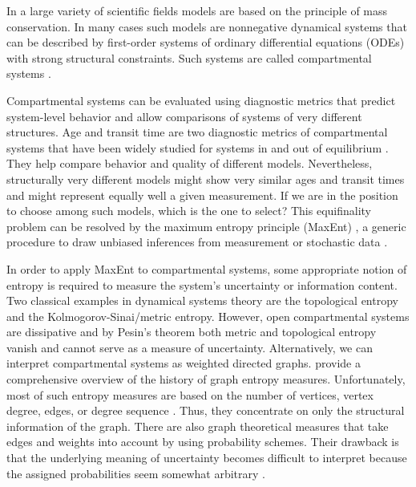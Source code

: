 \documentclass[smallextended]{svjour3}
\begin{document}
In a large variety of scientific fields models are based on the principle of mass conservation.
In many cases such models are nonnegative dynamical systems that can be described by first-order systems of ordinary differential equations (ODEs) with strong structural constraints.
Such systems are called compartmental systems \citealp{Anderson1983, Walter1999, Haddad2010}.

Compartmental systems can be evaluated using diagnostic metrics that predict system-level behavior and allow comparisons of systems of very different structures. 
Age and transit time are two diagnostic metrics of compartmental systems that have been widely studied for systems in and out of equilibrium \citep{Eriksson1971ARoEaS, Bolin1973tellus, Rasmussen2016JMB, Sierra2016GlobChangBiol, Metzler2018MGS, MetzlerMuellerSierra2018PNAS}.
They help compare behavior and quality of different models.
Nevertheless, structurally very different models might show very similar ages and transit times and might represent equally well a given measurement.
If we are in the position to choose among such models, which is the one to select?
This equifinality problem can be resolved by the maximum entropy principle (MaxEnt) \citep{Jaynes1957PR1, Jaynes1957PR2}, a generic procedure to draw unbiased inferences from measurement or stochastic data \citep{Presse2013RMP}.

In order to apply MaxEnt to compartmental systems, some appropriate notion of entropy is required to measure the system's uncertainty or information content.
Two classical examples in dynamical systems theory are the topological entropy and the Kolmogorov-Sinai/metric entropy.
However, open compartmental systems are dissipative and by Pesin's theorem \citep{Pesin1977UMN} both metric and topological entropy vanish and cannot serve as a measure of uncertainty.
Alternatively, we can interpret compartmental systems as weighted directed graphs.
\citet{Dehmer2011IS} provide a comprehensive overview of the history of graph entropy measures.
Unfortunately, most of such entropy measures are based on the number of vertices, vertex degree, edges, or degree sequence \citep{Trucco1956BoMB}.
Thus, they concentrate on only the structural information of the graph.
There are also graph theoretical measures that take edges and weights into account by using probability schemes.
Their drawback is that the underlying meaning of uncertainty becomes difficult to interpret because the assigned probabilities seem somewhat arbitrary \citep{Bonchev2005}.
\end{document}

